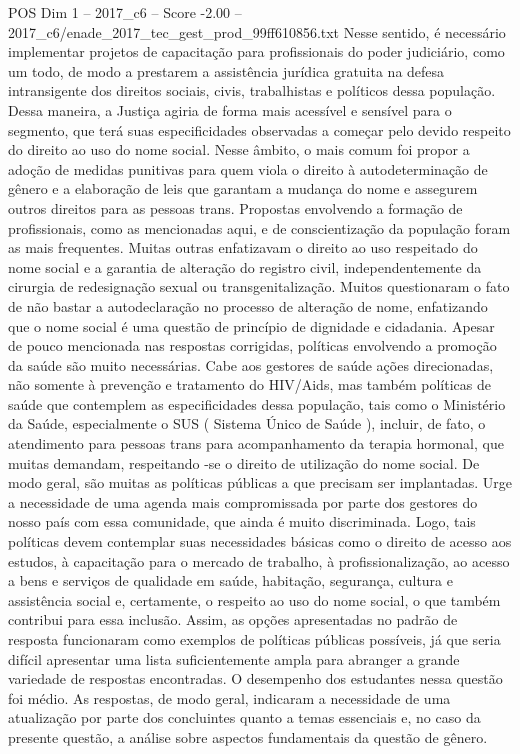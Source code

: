 \begin{textsample}{POS Dim 1 – 2017\_c6 – Score -2.00 – 2017\_c6/enade\_2017\_tec\_gest\_prod\_99ff610856.txt}
Nesse sentido, é necessário implementar projetos de capacitação para profissionais do poder judiciário, como um todo, de modo a prestarem a assistência jurídica gratuita na defesa intransigente dos direitos sociais, civis, trabalhistas e políticos dessa população.
Dessa maneira, a Justiça agiria de forma mais acessível e sensível para o segmento, que terá suas especificidades observadas a começar pelo devido respeito do direito ao uso do nome social.
Nesse âmbito, o mais comum foi propor a adoção de medidas punitivas para quem viola o direito à autodeterminação de gênero e a elaboração de leis que garantam a mudança do nome e assegurem outros direitos para as pessoas trans.
Propostas envolvendo a formação de profissionais, como as mencionadas aqui, e de conscientização da população foram as mais frequentes.
Muitas outras enfatizavam o direito ao uso respeitado do nome social e a garantia de alteração do registro civil, independentemente da cirurgia de redesignação sexual ou transgenitalização.
Muitos questionaram o fato de não bastar a autodeclaração no processo de alteração de nome, enfatizando que o nome social é uma questão de princípio de dignidade e cidadania.
Apesar de pouco mencionada nas respostas corrigidas, políticas envolvendo a promoção da saúde são muito necessárias.
Cabe aos gestores de saúde ações direcionadas, não somente à prevenção e tratamento do HIV/Aids, mas também políticas de saúde que contemplem as especificidades dessa população, tais como o Ministério da Saúde, especialmente o SUS ( Sistema Único de Saúde ), incluir, de fato, o atendimento para pessoas trans para acompanhamento da terapia hormonal, que muitas demandam, respeitando -se o direito de utilização do nome social.
De modo geral, são muitas as políticas públicas a que precisam ser implantadas.
Urge a necessidade de uma agenda mais compromissada por parte dos gestores do nosso país com essa comunidade, que ainda é muito discriminada.
Logo, tais políticas devem contemplar suas necessidades básicas como o direito de acesso aos estudos, à capacitação para o mercado de trabalho, à profissionalização, ao acesso a bens e serviços de qualidade em saúde, habitação, segurança, cultura e assistência social e, certamente, o respeito ao uso do nome social, o que também contribui para essa inclusão.
Assim, as opções apresentadas no padrão de resposta funcionaram como exemplos de políticas públicas possíveis, já que seria difícil apresentar uma lista suficientemente ampla para abranger a grande variedade de respostas encontradas.
O desempenho dos estudantes nessa questão foi médio.
As respostas, de modo geral, indicaram a necessidade de uma atualização por parte dos concluintes quanto a temas essenciais e, no caso da presente questão, a análise sobre aspectos fundamentais da questão de gênero.

\end{textsample}
